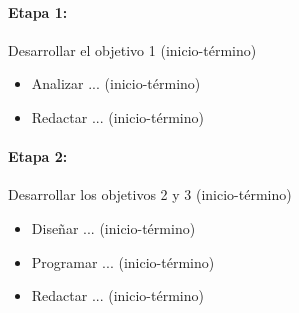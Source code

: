 \documentclass[11pt,letterpaper]{article}
\begin{document}
\paragraph{Etapa 1:} Desarrollar el objetivo 1 (inicio-término)
\begin{itemize}
\item Analizar ... (inicio-término)
\item Redactar ... (inicio-término)
\end{itemize}

\paragraph{Etapa 2:} Desarrollar los objetivos 2 y 3 (inicio-término)
\begin{itemize}
\item Diseñar ... (inicio-término)
\item Programar ... (inicio-término)
\item Redactar ... (inicio-término)
\end{itemize}





\end{document}
